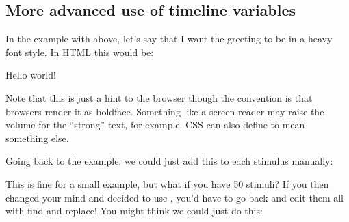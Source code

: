 \documentclass[letterpaper,10pt,english]{sphinxmanual}
\begin{document}
\subsection{More advanced use of timeline variables}
\label{\detokenize{jspsych_au:more-advanced-use-of-timeline-variables}}
In the example with  above, let’s say that I want the greeting
to be in a heavy font style.
In HTML this would be:

\begin{sphinxVerbatim}[commandchars=\\\{\}]
Hello world!
\end{sphinxVerbatim}

Note that this is just a hint to the browser \textendash{} though the convention is that
browsers render it as boldface. Something like a screen reader may
raise the volume for the “strong” text, for example. CSS can also define
 to mean something else.

Going back to the example, we could just add this to each stimulus manually:

\begin{sphinxVerbatim}[commandchars=\\\{\}]
   \PYG{p}{[}
\PYG{p}{]}
\end{sphinxVerbatim}

This is fine for a small example, but what if you have 50 stimuli? If you then
changed your mind and decided to use , you’d have to go back and edit
them all with find and replace! You might think we could just do this:

\begin{sphinxVerbatim}[commandchars=\\\{\}]
   
   
   
   
\end{sphinxVerbatim}
\end{document}
